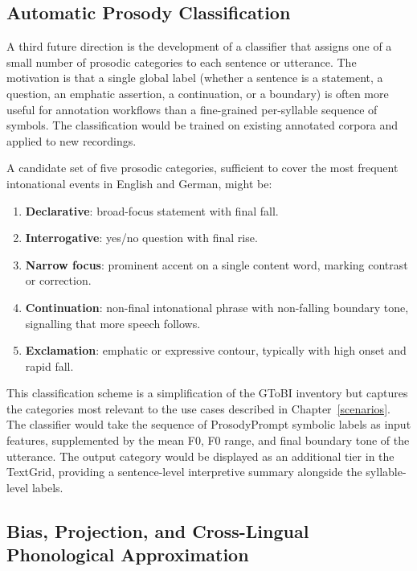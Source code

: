 \subsection{Automatic Prosody Classification}
\label{sec:prosody_classifier}

A third future direction is the development of a classifier that assigns one of a
small number of prosodic categories to each sentence or utterance. The motivation
is that a single global label (whether a sentence is a statement, a
question, an emphatic assertion, a continuation, or a boundary) is often more
useful for annotation workflows than a fine-grained per-syllable sequence of
symbols. The classification would be trained on existing annotated corpora and
applied to new recordings.

A candidate set of five prosodic categories, sufficient to cover the most
frequent intonational events in English and German, might be:
\begin{enumerate}
\item \textbf{Declarative}: broad-focus statement with final fall.
\item \textbf{Interrogative}: yes/no question with final rise.
\item \textbf{Narrow focus}: prominent accent on a single content word,
      marking contrast or correction.
\item \textbf{Continuation}: non-final intonational phrase with
      non-falling boundary tone, signalling that more speech follows.
\item \textbf{Exclamation}: emphatic or expressive contour, typically with
      high onset and rapid fall.
\end{enumerate}

This classification scheme is a simplification of the GToBI inventory but
captures the categories most relevant to the use cases described in
Chapter~\ref{scenarios}. The classifier would take the sequence of ProsodyPrompt
symbolic labels as input features, supplemented by the mean F0, F0 range, and
final boundary tone of the utterance. The output category would be displayed as
an additional tier in the TextGrid, providing a sentence-level interpretive
summary alongside the syllable-level labels.

\subsection{Bias, Projection, and Cross-Lingual Phonological Approximation}
\label{sec:bias_projection}

